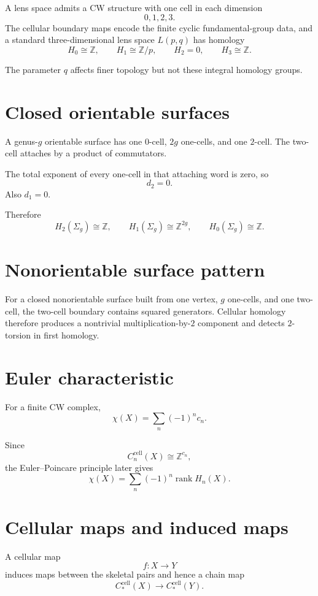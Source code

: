 A lens space admits a CW structure with one cell in each dimension
\[
0,1,2,3.
\]
The cellular boundary maps encode the finite cyclic fundamental-group data,
and a standard three-dimensional lens space \(L(p,q)\) has homology
\[
H_0\cong\mathbb Z,
\qquad
H_1\cong\mathbb Z/p,
\qquad
H_2=0,
\qquad
H_3\cong\mathbb Z.
\]

The parameter \(q\) affects finer topology but not these integral homology
groups.

\section{Closed orientable surfaces}

A genus-\(g\) orientable surface has one \(0\)-cell, \(2g\) one-cells, and one
\(2\)-cell.  The two-cell attaches by a product of commutators.

The total exponent of every one-cell in that attaching word is zero, so
\[
d_2=0.
\]
Also \(d_1=0\).

Therefore
\[
H_2(\Sigma_g)\cong\mathbb Z,
\qquad
H_1(\Sigma_g)\cong\mathbb Z^{2g},
\qquad
H_0(\Sigma_g)\cong\mathbb Z.
\]

\section{Nonorientable surface pattern}

For a closed nonorientable surface built from one vertex, \(g\) one-cells, and
one two-cell, the two-cell boundary contains squared generators.  Cellular
homology therefore produces a nontrivial multiplication-by-\(2\) component and
detects \(2\)-torsion in first homology.

\section{Euler characteristic}

For a finite CW complex,
\[
\chi(X)=\sum_n(-1)^n c_n.
\]

Since
\[
C_n^{\mathrm{cell}}(X)\cong\mathbb Z^{c_n},
\]
the Euler--Poincare principle later gives
\[
\chi(X)
=
\sum_n(-1)^n\operatorname{rank}H_n(X).
\]

\section{Cellular maps and induced maps}

A cellular map
\[
f:X\to Y
\]
induces maps between the skeletal pairs and hence a chain map
\[
C_*^{\mathrm{cell}}(X)\to C_*^{\mathrm{cell}}(Y).
\]

